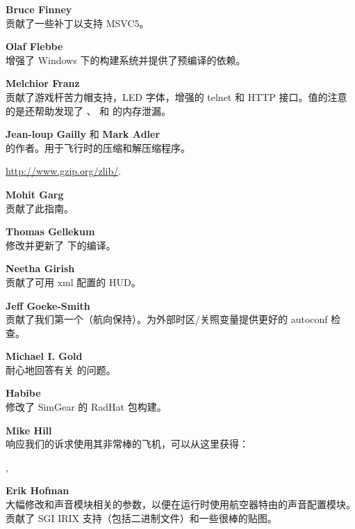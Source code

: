 \noindent \textbf{Bruce Finney}\\
  贡献了一些补丁以支持 MSVC5。
 \medskip

\noindent \textbf{Olaf Flebbe}\\
增强了 Windows 下的构建系统并提供了预编译的依赖。
 \medskip

\noindent \textbf{Melchior Franz}\\
贡献了游戏杆苦力帽支持，LED 字体，增强的 telnet 和 HTTP 接口。值的注意的是还帮助发现了 \FlightGear{}、\SimGear{} 和 \JSBSim{} 的内存泄漏。
  \medskip

\noindent \textbf{Jean-loup Gailly} 和 \textbf{Mark Adler}\\
的作者。用于飞行时的压缩和解压缩程序。

  \href{http://www.gzip.org/zlib/}{http://www.gzip.org/zlib/}.
 \medskip

\noindent \textbf{Mohit Garg}\\
贡献了此指南。
 \medskip

\noindent \textbf{Thomas Gellekum}\\
修改并更新了  下的编译。
 \medskip

\noindent \textbf{Neetha Girish}\\
贡献了可用 xml 配置的 HUD。
 \medskip

\noindent \textbf{Jeff Goeke-Smith}\\
贡献了我们第一个（航向保持）。为外部时区/关照变量提供更好的 autoconf 检查。
 \medskip

\noindent \textbf{Michael I. Gold}\\
耐心地回答有关  的问题。
 \medskip

\noindent \textbf{Habibe}\\
修改了 SimGear 的 RadHat 包构建。
 \medskip

\noindent \textbf{Mike Hill}\\
响应我们的诉求使用其非常棒的飞机，可以从这里获得：
 \medskip

 ,

 \medskip

\noindent \textbf{Erik Hofman}\\
大幅修改和声音模块相关的参数，以便在运行时使用航空器特由的声音配置模块。贡献了 SGI IRIX 支持（包括二进制文件）和一些很棒的贴图。
 \medskip

